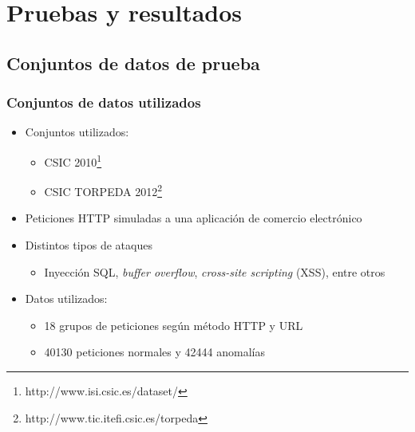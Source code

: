 \section{Pruebas y resultados}



\subsection{Conjuntos de datos de prueba}

\begin{frame}
    \frametitle{Conjuntos de datos utilizados}

    \begin{itemize}
        \item
        Conjuntos utilizados:

        \begin{itemize}
            \item
            CSIC 2010\footnote{http://www.isi.csic.es/dataset/}

            \item
            CSIC TORPEDA 2012\footnote{http://www.tic.itefi.csic.es/torpeda}
        \end{itemize}

        \item
        Peticiones HTTP simuladas a una aplicación de comercio electrónico

        \item
        Distintos tipos de ataques

        \begin{itemize}
            \item
            Inyección SQL, \textit{buffer overflow}, \textit{cross-site scripting} (XSS),
            entre otros
        \end{itemize}

        \item
        Datos utilizados:

        \begin{itemize}
            \item
            18 grupos de peticiones según método HTTP y URL

            \item
            \num{40130} peticiones normales y \num{42444} anomalías
        \end{itemize}
    \end{itemize}
\end{frame}



